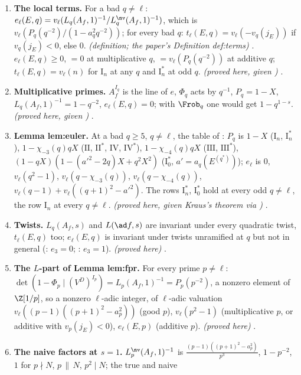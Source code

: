 \begin{enumerate}[label=\textbf{\thechapter.\arabic*}]
which are therefore finite. \emph{(stated; reference)} .
\item \textbf{The local terms.} For a bad $q\ne\ell$: $e_\ell(E,q)=v_\ell(L_q(A_f,1)^{-1}/L_q^{\nv}(A_f,1)^{-1})$, which is $v_\ell(P_q(q^{-2})/(1-a_q^2q^{-2}))$; for every bad $q$:
$t_\ell(E,q)=v_\ell(-v_q(j_E))$ if $v_q(j_E)<0$, else $0$. \emph{(definition; the paper's Definition def:terms)} .
$e_\ell(E,q)\ge0$, $=0$ at multiplicative $q$, $=v_\ell(P_q(q^{-2}))$ at additive $q$; $t_\ell(E,q)=v_\ell(n)$ for $\mathrm I_n$ at any $q$ and $\mathrm I_n^*$ at odd $q$.
\emph{(proved here, given )} .
\item \textbf{Multiplicative primes.} $A_f^{I_q}$ is the line of $e$, $\Phi_q$ acts by $q^{-1}$, $P_q=1-X$, $L_q(A_f,1)^{-1}=1-q^{-2}$, $e_\ell(E,q)=0$; with $\Frob_q$ one would get
$1-q^{1-s}$. \emph{(proved here, given )} .
\item \textbf{Lemma lem:euler.} At a bad $q\ge5$, $q\ne\ell$, the table of : $P_q$ is $1-X$ ($\mathrm I_n$, $\mathrm I_n^*$), $1-\chi_{-3}(q)qX$ ($\mathrm{II}$,
$\mathrm{II}^*$, $\mathrm{IV}$, $\mathrm{IV}^*$), $1-\chi_{-4}(q)qX$ ($\mathrm{III}$, $\mathrm{III}^*$), $(1-qX)(1-(a'^2-2q)X+q^2X^2)$ ($\mathrm I_0^*$, $a'=a_q(E^{(q^*)})$); $e_\ell$ is $0$,
$v_\ell(q^2-1)$, $v_\ell(q-\chi_{-3}(q))$, $v_\ell(q-\chi_{-4}(q))$, $v_\ell(q-1)+v_\ell((q+1)^2-a'^2)$. The rows $\mathrm I_n^*$, $\mathrm I_0^*$ hold at every odd $q\ne\ell$, the row $\mathrm I_n$
at every $q\ne\ell$. \emph{(proved here, given Kraus's theorem via )} .
\item \textbf{Twists.} $L_q(A_f,s)$ and $L(\ad f,s)$ are invariant under every quadratic twist, $t_\ell(E,q)$ too; $e_\ell(E,q)$ is invariant under twists unramified
at $q$ but not in general (: $e_3=0$; : $e_3=1$). \emph{(proved here)} .
\item \textbf{The $L$-part of Lemma lem:fpr.} For every prime $p\ne\ell$: $\det(1-\Phi_p\mid(V^D)^{I_p})=L_p(A_f,1)^{-1}=P_p(p^{-2})$, a nonzero element of
$\Z[1/p]$, so a nonzero $\ell$-adic integer, of $\ell$-adic valuation $v_\ell((p-1)((p+1)^2-a_p^2))$ (good $p$), $v_\ell(p^2-1)$ (multiplicative $p$, or additive with
$v_p(j_E)<0$), $e_\ell(E,p)$ (additive $p$). \emph{(proved here)} .
\item \textbf{The naive factors at $s=1$.} $L_p^{\nv}(A_f,1)^{-1}$ is $\frac{(p-1)((p+1)^2-a_p^2)}{p^3}$, $1-p^{-2}$, $1$ for $p\nmid N$, $p\,\|\,N$, $p^2\mid N$; the true and naive

\end{enumerate}
